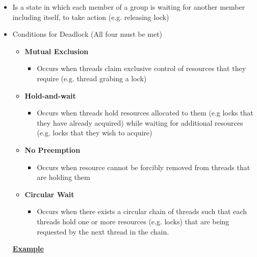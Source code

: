 \documentclass[12pt]{article}
\begin{document}
\begin{enumerate}[1.]
\begin{enumerate}[a)]
\begin{itemize}
            \begin{itemize}
                \item Is a state in which each member of a group is waiting for
                another member including itself, to take action (e.g. releasing lock)
                \item Conditions for Deadlock (All four must be met)

                \begin{itemize}
                    \item \textbf{Mutual Exclusion}
                    \begin{itemize}
                        \item Occurs when threads claim exclusive control of resources that
                        they require (e.g. thread grabing a lock)
                    \end{itemize}
                    \item \textbf{Hold-and-wait}
                    \begin{itemize}
                        \item Occurs when threads hold resources allocated to them (e.g locks that they have already acquired)
                        while waiting for additional resources (e.g. locks that they wish to acquire)
                    \end{itemize}

                    \item \textbf{No Preemption}
                    \begin{itemize}
                        \item Occurs when resource cannot be forcibly removed from threads that are holding them
                    \end{itemize}
                    \item \textbf{Circular Wait}
                    \begin{itemize}
                        \item Occurs when there exists a circular chain of threads such that
                        each threads hold one or more resources (e.g. locks) that are being
                        requested by the next thread in the chain.
                    \end{itemize}
                \end{itemize}

                \bigskip

                \underline{\textbf{Example}}


\end{itemize}
\end{itemize}
\end{enumerate}
\end{enumerate}
\end{document}

